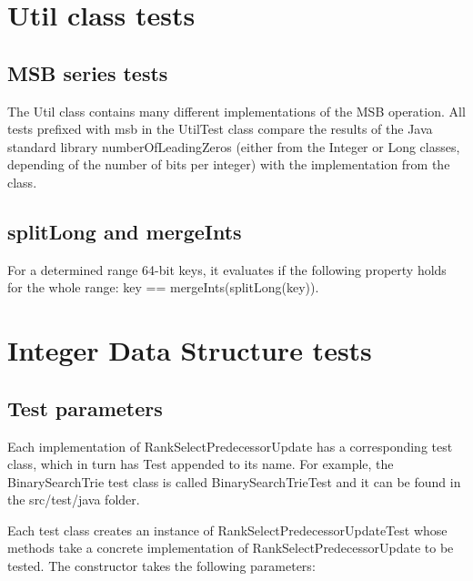 \section{{\ttfamily Util} class tests}

\subsection{MSB series tests}

The {\ttfamily Util} class contains many different implementations of the MSB operation. All tests prefixed with {\ttfamily msb} in the {\ttfamily UtilTest} class compare the results of the Java standard library {\ttfamily numberOfLeadingZeros} (either from the {\ttfamily Integer} or {\ttfamily Long} classes, depending of the number of bits per integer) with the implementation from the class.

\subsection{{\ttfamily splitLong} and {\ttfamily mergeInts}}

For a determined range 64-bit keys, it evaluates if the following property holds for the whole range: {\ttfamily key == mergeInts(splitLong(key))}.

\section{Integer Data Structure tests}

\subsection{Test parameters}

Each implementation of {\ttfamily RankSelectPredecessorUpdate} has a corresponding test class, which in turn has {\ttfamily Test} appended to its name. For example, the {\ttfamily BinarySearchTrie} test class is called {\ttfamily BinarySearchTrieTest} and it can be found in the {\ttfamily src/test/java} folder.

Each test class creates an instance of {\ttfamily RankSelectPredecessorUpdateTest} whose methods take a concrete implementation of {\ttfamily RankSelectPredecessorUpdate} to be tested. The constructor takes the following parameters:

